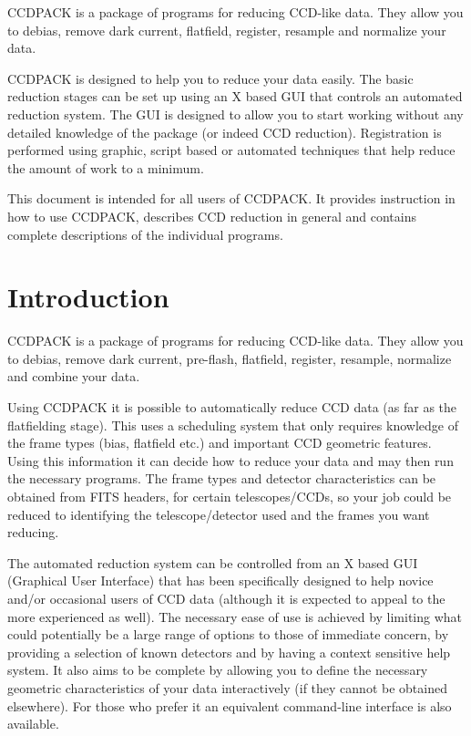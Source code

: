 \documentclass[twoside,11pt]{article}
\newcommand{\stardocinitials}  {SUN}
\newcommand{\stardocnumber}    {139.12}
\newcommand{\stardocabstract}  {
CCDPACK is a package of programs for reducing CCD-like data. They
allow you to debias, remove dark current, flatfield, register,
resample and normalize your data.

CCDPACK is designed to help you to reduce your data easily.
The basic reduction stages can be set up using an X based GUI that
controls an automated reduction system.
The GUI is designed to allow you to start working without any
detailed knowledge of the package (or indeed CCD reduction).
Registration is performed using graphic, script based or automated
techniques that help reduce the amount of work to a minimum.

This document is intended for all users of CCDPACK.
It provides instruction in how to use CCDPACK, describes CCD reduction
in general and contains complete descriptions of the individual
programs.
}
\newcommand{\stardocname}{\stardocinitials /\stardocnumber}
\newenvironment{latexonly}{}{}
\newcommand{\xlabel}[1]{}
\renewcommand{\_}{\texttt{\symbol{95}}}
\renewcommand{\thepage}{\roman{page}}
\begin{document}
\stardocabstract
  \newpage
  \begin{latexonly}
    \setlength{\parskip}{0mm}
    \tableofcontents
    \setlength{\parskip}{\medskipamount}
    \markboth{\stardocname}{\stardocname}
  \end{latexonly}
\cleardoublepage
\renewcommand{\thepage}{\arabic{page}}
\setcounter{page}{1}

\section{\xlabel{introduction}Introduction}

CCDPACK is a package of programs for reducing CCD-like data. They
allow you to debias, remove dark current, pre-flash, flatfield,
register, resample, normalize and combine your data.

Using CCDPACK it is possible to automatically reduce CCD data (as far
as the flatfielding stage). This uses a scheduling system that only
requires knowledge of the frame types (bias, flatfield etc.) and
important CCD geometric features.
Using this information it can decide how to reduce your data and may
then run the necessary programs.
The frame types and detector characteristics can be obtained from FITS
headers, for certain telescopes/CCDs, so your job could be reduced to
identifying the telescope/detector used and the frames you want
reducing.

The automated reduction system can be controlled from an X based GUI
(Graphical User Interface) that has been specifically designed to
help novice and/or occasional users of CCD data (although it is
expected to appeal to the more experienced as well).
The necessary ease of use is achieved by limiting what could
potentially be a large range of options to those of immediate concern,
by providing a selection of known detectors and by having a context
sensitive help system.
It also aims to be complete by allowing you to define the necessary
geometric characteristics of your data interactively (if they cannot
be obtained elsewhere).
For those who prefer it an equivalent command-line interface is also
available.
\end{document}
